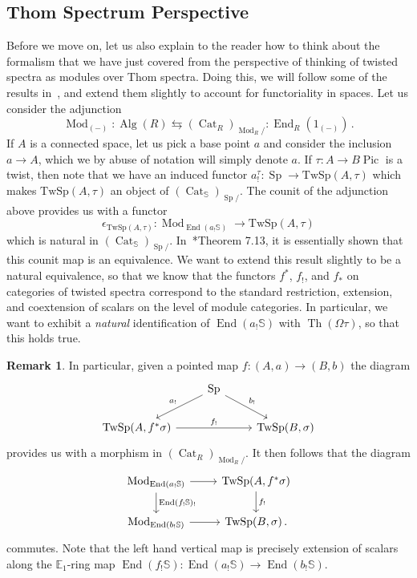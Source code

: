 \documentclass[10pt]{amsart}
\newcommand{\longto}{\longrightarrow}
\theoremstyle{plain}
\theoremstyle{definition}
\newtheorem{rmk}[theorem]{Remark}
\DeclareMathOperator{\Mod}{Mod}
\DeclareMathOperator{\End}{End}
\DeclareMathOperator{\Sp}{Sp}
\DeclareMathOperator{\Th}{Th}
\DeclareMathOperator{\Pic}{Pic}
\DeclareMathOperator{\Alg}{Alg}
\DeclareMathOperator{\Cat}{Cat}
\newcommand{\bE}{\mathbb{E}}
\newcommand{\bS}{\mathbb{S}}
\newcommand{\TwSp}{\mathrm{TwSp}}
\begin{document}
\subsection{Thom Spectrum Perspective} \label{sec:TwSp_ModTh}

Before we move on, let us also explain to the reader how to think about the formalism that we have just covered from the perspective of thinking of twisted spectra as modules over Thom spectra.
Doing this, we will follow some of the results in~\cite{CCRY23}, and extend them slightly to account for functoriality in spaces.
Let us consider the adjunction
\[
\Mod_{(-)} : \Alg(R) \leftrightarrows (\Cat_{R})_{\Mod_R/} : \End_R(1_{(-)}) \,.
\]
If $A$ is a connected space, let us pick a base point $a$ and consider the inclusion $a \to A$, which we by abuse of notation will simply denote $a$.
If $\tau : A \to B\Pic$ is a twist, then note that we have an induced functor $a^{\tau}_! : \Sp \to \TwSp(A,\tau)$ which makes $\TwSp(A,\tau)$ an object of $(\Cat_{\bS})_{\Sp/}$.
The counit of the adjunction above provides us with a functor
\[
\epsilon_{\TwSp(A,\tau)} : \Mod_{\End(a_! \bS )} \longto \TwSp(A,\tau)
\]
which is natural in $(\Cat_{\bS})_{\Sp /}$.
In~\cite{CCRY23}*{Theorem 7.13}, it is essentially shown that this counit map is an equivalence.
We want to extend this result slightly to be a natural equivalence, so that we know that the functors $f^*$, $f_!$, and $f_*$ on categories of twisted spectra correspond to the standard restriction, extension, and coextension of scalars on the level of module categories.
In particular, we want to exhibit a \emph{natural} identification of $\End(a_! \bS)$ with $\Th(\Omega \tau)$, so that this holds true.


\begin{rmk}\label{rmk:commutative_diagram}
In particular, given a pointed map $f : (A,a) \to (B,b)$ the diagram
\[
\begin{tikzcd}
  & \arrow[dl,"a_!"'] \Sp \arrow[dr,"b_!"] & \\
  \TwSp(A,f^* \sigma) \arrow[rr,"f_!"] & & \TwSp(B,\sigma)
\end{tikzcd}
\]
provides us with a morphism in $(\Cat_R)_{\Mod_R / }$. It then follows that the diagram
\[
\begin{tikzcd}
\Mod_{\End(a_! \bS)} \arrow[r] \arrow[d,"\End(f_! \bS)_!"] & \TwSp(A,f^* \sigma) \arrow[d,"f_!"] \\
\Mod_{\End(b_! \bS)} \arrow[r] & \TwSp(B,\sigma) \,.
\end{tikzcd}
\]
commutes.
Note that the left hand vertical map is precisely extension of scalars along the $\bE_1$-ring map $\End(f_! \bS) : \End(a_! \bS) \to \End(b_! \bS)$.
\end{rmk}
\end{document}
